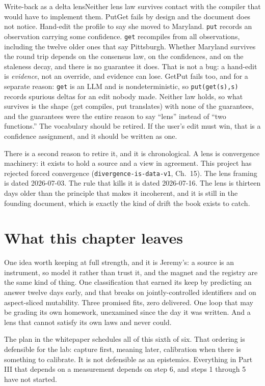 \begin{Analogy}{Write-back as a delta lens}{Neither lens law survives contact with the compiler that would have to implement them.}
PutGet fails by design and the document does not notice. Hand-edit the profile to say she moved to Maryland. \texttt{put} records an observation carrying some confidence. \texttt{get} recompiles from all observations, including the twelve older ones that say Pittsburgh. Whether Maryland survives the round trip depends on the consensus law, on the confidences, and on the staleness decay, and there is no guarantee it does. That is not a bug: a hand-edit is \emph{evidence}, not an override, and evidence can lose. GetPut fails too, and for a separate reason: \texttt{get} is an LLM and is nondeterministic, so \texttt{put(get(s),s)} records spurious deltas for an edit nobody made. Neither law holds, so what survives is the shape (get compiles, put translates) with none of the guarantees, and the guarantees were the entire reason to say ``lens'' instead of ``two functions.'' The vocabulary should be retired. If the user's edit must win, that is a confidence assignment, and it should be written as one.
\end{Analogy}

There is a second reason to retire it, and it is chronological. A lens is convergence machinery: it exists to hold a source and a view in agreement. This project has rejected forced convergence (\texttt{divergence-is-data-v1}, Ch.~15). The lens framing is dated 2026-07-03. The rule that kills it is dated 2026-07-16. The lens is thirteen days older than the principle that makes it incoherent, and it is still in the founding document, which is exactly the kind of drift the book exists to catch.

\section{What this chapter leaves}

One idea worth keeping at full strength, and it is Jeremy's: a source is an instrument, so model it rather than trust it, and the magnet and the registry are the same kind of thing. One classification that earned its keep by predicting an answer twelve days early, and that breaks on jointly-controlled identifiers and on aspect-sliced mutability. Three promised fits, zero delivered. One loop that may be grading its own homework, unexamined since the day it was written. And a lens that cannot satisfy its own laws and never could.

The plan in the whitepaper schedules all of this sixth of six. That ordering is defensible for the lab: capture first, meaning later, calibration when there is something to calibrate. It is not defensible as an epistemics. Everything in Part III that depends on a measurement depends on step 6, and steps 1 through 5 have not started.
